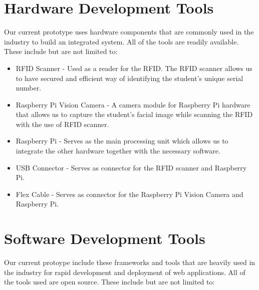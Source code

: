 \section{Hardware Development Tools}
Our current prototype uses hardware components that are commonly used in the industry to build an integrated system. All of the tools are readily available. These include but are not limited to:

\begin{itemize}
	\item	RFID Scanner - Used as a reader for the RFID. The RFID scanner allows us to have secured and efficient way of identifying the student's unique serial number.

\end{itemize}

\begin{itemize}
	\item	Raspberry Pi Vision Camera - A camera module for Raspberry Pi hardware that allows us to capture the student's facial image while scanning the RFID with the use of RFID scanner.
	
\end{itemize} 

\begin{itemize}
	\item	Raspberry Pi - Serves as the main processing unit which allows us to integrate the other hardware together with the necessary software.
	
\end{itemize}

\begin{itemize}
	\item	USB Connector -  Serves as connector for the RFID scanner and Raspberry Pi.
	
\end{itemize}

\begin{itemize}
	\item	Flex Cable -  Serves as connector for the Raspberry Pi Vision Camera and Raspberry Pi. 
	
\end{itemize}
	
\section{Software Development Tools}
\label{sec:devtools}
 Our current protoype include these frameworks and tools that are heavily used in the industry for rapid development and deployment of web applications. All of the tools used are open source. These include but are not limited to:
 
